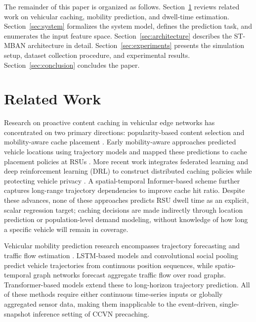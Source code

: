 \documentclass[journal]{IEEEtran}
\begin{document}
The remainder of this paper is organized as follows.
Section~\ref{sec:related} reviews related work on vehicular caching, mobility prediction, and dwell-time estimation.
Section~\ref{sec:system} formalizes the system model, defines the prediction task, and enumerates the input feature space.
Section~\ref{sec:architecture} describes the ST-MBAN architecture in detail.
Section~\ref{sec:experiments} presents the simulation setup, dataset collection procedure, and experimental results.
Section~\ref{sec:conclusion} concludes the paper.


\section{Related Work} \label{sec:related}

Research on proactive content caching in vehicular edge networks has concentrated on two primary directions: popularity-based content selection and mobility-aware cache placement \cite{Bui2017, Wang2020IoT, WangGrace2023, Chen2020Coop, Yao2021Coop}.
Early mobility-aware approaches predicted vehicle locations using trajectory models and mapped these predictions to cache placement policies at RSUs \cite{Khelifi2018, Nam2021Adaptive, Nam2023Multiple}.
More recent work integrates federated learning and deep reinforcement learning (DRL) to construct distributed caching policies while protecting vehicle privacy \cite{Wang2023Async, Jiang2024, Yu2023Mobility}.
A spatial-temporal Informer-based scheme \cite{Wang2025Informer} further captures long-range trajectory dependencies to improve cache hit ratio.
Despite these advances, none of these approaches predicts RSU dwell time as an explicit, scalar regression target; caching decisions are made indirectly through location prediction or population-level demand modeling, without knowledge of how long a specific vehicle will remain in coverage.

Vehicular mobility prediction research encompasses trajectory forecasting and traffic flow estimation \cite{Altche2017, Deo2018, Yu2018STGCN, Guo2019ASTGCN}.
LSTM-based models \cite{Altche2017} and convolutional social pooling \cite{Deo2018} predict vehicle trajectories from continuous position sequences, while spatio-temporal graph networks \cite{Yu2018STGCN, Guo2019ASTGCN} forecast aggregate traffic flow over road graphs.
Transformer-based models \cite{Transformer2024} extend these to long-horizon trajectory prediction.
All of these methods require either continuous time-series inputs or globally aggregated sensor data, making them inapplicable to the event-driven, single-snapshot inference setting of CCVN precaching.
\end{document}
